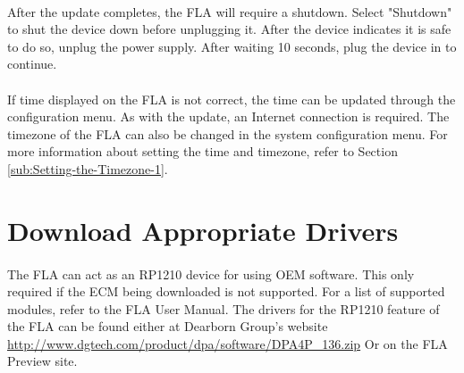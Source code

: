 \documentclass[11pt, oneside]{book}
\begin{document}
\paragraph{  }
After the update completes, the FLA will require a shutdown. Select "Shutdown" to shut the device down before unplugging it. After the device indicates it is safe to do so, unplug the power supply. After waiting 10 seconds, plug the device in to continue.
\paragraph{  }
If time displayed on the FLA is not correct, the time can be updated through the configuration menu. As with the update, an Internet connection is required. The timezone of the FLA can also be changed in the system configuration menu. For more information about setting the time and timezone, refer to Section \ref{sub:Setting-the-Timezone-1}.
\section{Download Appropriate Drivers}\label{subsec:RP1210_Drivers}
\paragraph{  }
The FLA can act as an RP1210 device for using OEM software. This only required if the ECM being downloaded is not supported. For a list of supported modules, refer to the FLA User Manual. The drivers for the RP1210 feature of the FLA can be found either at Dearborn Group's website
\url{http://www.dgtech.com/product/dpa/software/DPA4P_136.zip} 
Or on the FLA Preview site.
\end{document}
